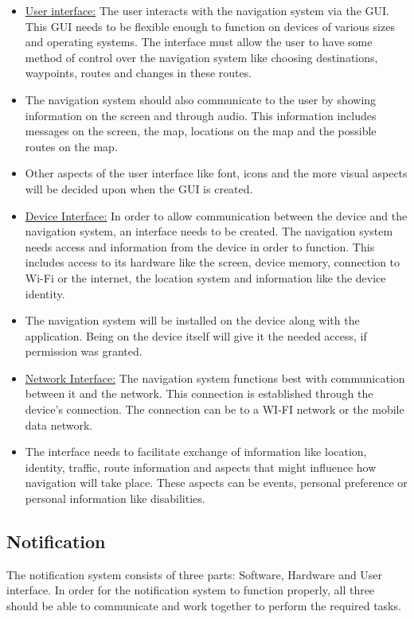 \documentclass[runningheads,a4paper]{article}
\begin{document}
\begin{itemize}
\item \underline{User interface:} 
The user interacts with the navigation system via the GUI. This GUI needs to be flexible enough to function on devices of various sizes and operating systems. The interface must allow the user to have some method of control over the navigation system like choosing destinations, waypoints, routes and changes in these routes. 

\item The navigation system should also communicate to the user by showing information on the screen and through audio. This information includes messages on the screen, the map, locations on the map and the possible routes on the map.

\item Other aspects of the user interface like font, icons and the more visual aspects will be decided upon when the GUI is created.

\item \underline{Device Interface:}
In order to allow communication between the device and the navigation system, an interface needs to be created. The navigation system needs access and information from the device in order to function. This includes access to its hardware like the screen, device memory, connection to Wi-Fi or the internet, the location system and information like the device identity. 

\item The navigation system will be installed on the device along with the application. Being on the device itself will give it the needed access, if permission was granted. 

\item \underline{Network Interface:}
The navigation system functions best with communication between it and the network. This connection is established through the device’s connection. The connection can be to a WI-FI network or the mobile data network. 

\item The interface needs to facilitate exchange of information like location, identity, traffic, route information and aspects that might influence how navigation will take place. These aspects can be events, personal preference or personal information like disabilities. 

\end{itemize}

\subsection{Notification}
The notification system consists of three parts: Software, Hardware and User interface. In order for the notification system to function properly, all three should be able to communicate and work together to perform the required tasks. 
\end{document}
